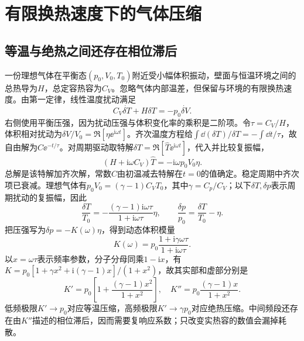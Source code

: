 \section{有限换热速度下的气体压缩}
\subsection{等温与绝热之间还存在相位滞后}
一份理想气体在平衡态$(p_0,V_0,T_0)$附近受小幅体积振动，壁面与恒温环境之间的总热导为$H$，总定容热容为$C_V$。忽略气体内部温差，但保留与环境的有限换热速度。由第一定律，线性温度扰动满足
\[
 C_V\dot{\delta T}+H\delta T=-p_0\dot{\delta V}.
\]
右侧使用平衡压强，因为扰动压强与体积变化率的乘积是二阶项。令$\tau=C_V/H$，体积相对扰动为$\delta V/V_0=\Re[\eta\ee^{\mathrm i\omega t}]$。齐次温度方程给$\int\dd(\delta T)/\delta T=-\int\dd t/\tau$，故自由解为$C\ee^{-t/\tau}$。对周期驱动取特解$\delta T=\Re[\widehat T\ee^{\mathrm i\omega t}]$，代入并比较复振幅，
\[
 (H+\mathrm i\omega C_V)\widehat T=-\mathrm i\omega p_0V_0\eta.
\]
总解是该特解加齐次解，常数$C$由初温减去特解在$t=0$的值确定。稳定周期中齐次项已衰减。理想气体有$p_0V_0=(\gamma-1)C_VT_0$，其中$\gamma=C_p/C_V$；以下$\delta T,\delta p$表示周期扰动的复振幅，因此
\[
 \frac{\delta T}{T_0}=-\frac{(\gamma-1)\mathrm i\omega\tau}{1+\mathrm i\omega\tau}\eta,
 \qquad \frac{\delta p}{p_0}=\frac{\delta T}{T_0}-\eta.
\]
把压强写为$\delta p=-K(\omega)\eta$，得到动态体积模量
\[
 K(\omega)=p_0\frac{1+\mathrm i\gamma\omega\tau}{1+\mathrm i\omega\tau}.
\]
以$x=\omega\tau$表示频率参数，分子分母同乘$1-\mathrm ix$，有$K=p_0[1+\gamma x^2+\mathrm i(\gamma-1)x]/(1+x^2)$，故其实部和虚部分别是
\[
 K'=p_0\left[1+\frac{(\gamma-1)x^2}{1+x^2}\right],\quad
 K''=p_0\frac{(\gamma-1)x}{1+x^2}.
\]
低频极限$K'\to p_0$对应等温压缩，高频极限$K'\to\gamma p_0$对应绝热压缩。中间频段还存在由$K''$描述的相位滞后，因而需要复响应系数；只改变实热容的数值会漏掉耗散。

